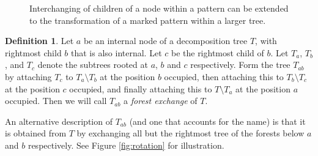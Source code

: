 \documentclass[10pt]{article}
\theoremstyle{definition}
\newtheorem{definition}[theorem]{Definition}
\numberwithin{equation}{section}
\numberwithin{figure}{section}
\begin{document}
\begin{figure}[t]
{
    }
\caption{Interchanging of children of a node within a pattern can be extended
to the transformation of a marked pattern within a larger tree.}
  \label{fig:shuffle}
  \end{figure}

\begin{definition}
Let $a$ be an internal node of a decomposition tree $T$, with rightmost child $b$ that is also internal. Let $c$ be the rightmost child of $b$. Let $T_a$, $T_b$, and $T_c$ denote the subtrees rooted at $a$, $b$ and $c$ respectively. Form the tree $T_{ab}$ by attaching $T_c$ to $T_a \setminus T_b$ at the position $b$ occupied, then attaching this to $T_b \setminus T_c$ at the position $c$ occupied, and finally attaching this to $T \setminus T_a$ at the position $a$ occupied. Then we will call $T_{ab}$ a \emph{forest exchange} of $T$.
\end{definition}

An alternative description of $T_{ab}$ (and one that accounts for the name) is that it is obtained from $T$ by exchanging all but the rightmost tree of the forests below $a$ and $b$ respectively. See Figure \ref{fig:rotation} for illustration.
\end{document}
